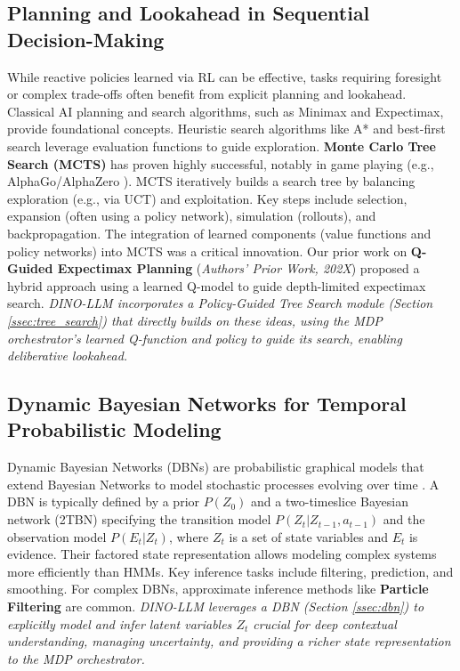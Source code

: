 \documentclass[11pt]{article}
\begin{document}
\subsection{Planning and Lookahead in Sequential Decision-Making}
\label{sec:rw_planning}
While reactive policies learned via RL can be effective, tasks requiring foresight or complex trade-offs often benefit from explicit planning and lookahead. Classical AI planning and search algorithms, such as Minimax and Expectimax, provide foundational concepts. Heuristic search algorithms like A* and best-first search leverage evaluation functions to guide exploration.
\textbf{Monte Carlo Tree Search (MCTS)} has proven highly successful, notably in game playing (e.g., AlphaGo/AlphaZero \citep{Silver2016MasteringTG,Silver2017MasteringC}). MCTS iteratively builds a search tree by balancing exploration (e.g., via UCT) and exploitation. Key steps include selection, expansion (often using a policy network), simulation (rollouts), and backpropagation. The integration of learned components (value functions and policy networks) into MCTS was a critical innovation.
Our prior work on \textbf{Q-Guided Expectimax Planning} (\textit{Authors' Prior Work, 202X}) proposed a hybrid approach using a learned Q-model to guide depth-limited expectimax search.
\textit{DINO-LLM incorporates a Policy-Guided Tree Search module (Section \ref{ssec:tree_search}) that directly builds on these ideas, using the MDP orchestrator's learned Q-function and policy to guide its search, enabling deliberative lookahead.}

\subsection{Dynamic Bayesian Networks for Temporal Probabilistic Modeling}
\label{sec:rw_dbn}
Dynamic Bayesian Networks (DBNs) are probabilistic graphical models that extend Bayesian Networks to model stochastic processes evolving over time \citep{Murphy2002DynamicBN, Ghahramani1997LearningDP}. A DBN is typically defined by a prior $P(Z_0)$ and a two-timeslice Bayesian network (2TBN) specifying the transition model $P(Z_t | Z_{t-1}, a_{t-1})$ and the observation model $P(E_t | Z_t)$, where $Z_t$ is a set of state variables and $E_t$ is evidence. Their factored state representation allows modeling complex systems more efficiently than HMMs. Key inference tasks include filtering, prediction, and smoothing. For complex DBNs, approximate inference methods like \textbf{Particle Filtering} are common.
\textit{DINO-LLM leverages a DBN (Section \ref{ssec:dbn}) to explicitly model and infer latent variables $Z_t$ crucial for deep contextual understanding, managing uncertainty, and providing a richer state representation to the MDP orchestrator.}
\end{document}
